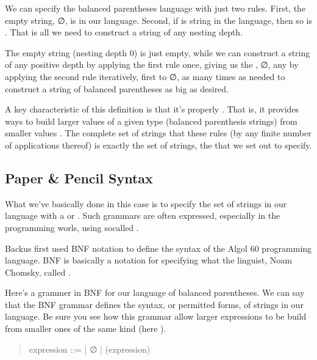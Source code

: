 \documentclass[letterpaper,10pt,english]{sphinxmanual}
\begin{document}
\sphinxAtStartPar
We can specify the balanced parentheses language with just two
rules. First, the empty string, ∅, is in our language. Second,
if  is  string in the language, then so is . That
is all we need to construct a string of any nesting depth.

\sphinxAtStartPar
The empty string (nesting depth 0) is just empty, while we can
construct a string of any positive depth by applying the first
rule once, giving us the , ∅, any by applying the
second rule iteratively, first to ∅, as many times as needed to
construct a string of balanced parentheses as big as desired.

\sphinxAtStartPar
A key characteristic of this definition is that it’s properly
. That is, it provides ways to build larger values
of a given type (balanced parenthesis strings) from smaller
values . The complete set of strings that
these rules  (by any finite number of applications
thereof) is exactly the set of strings, the 
that we set out to specify.


\subsection{Paper \& Pencil Syntax}
\label{\detokenize{A_01_Propositional_Logic:paper-pencil-syntax}}
\sphinxAtStartPar
What we’ve basically done in this case is to specify the set of
strings in our language with a  or .
Such grammars are often expressed, especially in the programming
worls, using so\sphinxhyphen{}called .

\sphinxAtStartPar
Backus first used BNF notation to define the syntax of the Algol
60 programming language. BNF is basically a notation for specifying
what the linguist, Noam Chomsky, called .

\sphinxAtStartPar
Here’s a grammer in BNF for our language of balanced parentheses.
We can say that the BNF grammar defines the syntax, or permitted
forms, of strings in our language. Be sure you see how this grammar
allow larger expressions to be build from smaller ones of the same
kind (here ).
\begin{quote}

\sphinxAtStartPar
expression ::=
| ∅
| (expression)
\end{quote}
\end{document}
